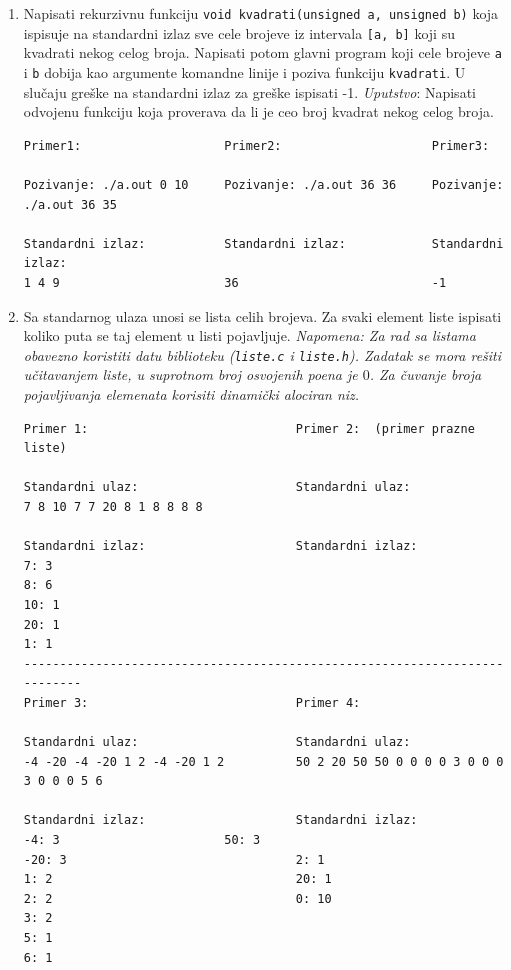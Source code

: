 \begin{enumerate}
\item Napisati rekurzivnu funkciju \texttt{void kvadrati(unsigned a, unsigned b)} koja ispisuje na standardni izlaz sve cele brojeve iz intervala \texttt{[a, b]} koji su kvadrati nekog celog broja. Napisati potom glavni program koji cele brojeve \texttt{a} i \texttt{b} dobija kao argumente komandne linije i poziva funkciju \texttt{kvadrati}. U slučaju greške na standardni izlaz za greške ispisati -1. \emph{Uputstvo}: Napisati odvojenu funkciju koja proverava da li je ceo broj kvadrat nekog celog broja.
\begin{verbatim}
Primer1:                    Primer2:                     Primer3:                    
 
Pozivanje: ./a.out 0 10     Pozivanje: ./a.out 36 36     Pozivanje: ./a.out 36 35    

Standardni izlaz:           Standardni izlaz:            Standardni izlaz:           
1 4 9                       36                           -1                          
\end{verbatim}

\item Sa standarnog ulaza unosi se lista celih brojeva. Za svaki element liste ispisati koliko puta se taj element u listi pojavljuje. {\em Napomena: Za rad sa listama obavezno koristiti datu biblioteku ({\tt liste.c} i {\tt liste.h}). Zadatak se mora rešiti učitavanjem liste, u suprotnom broj osvojenih poena je $0$. Za čuvanje broja pojavljivanja elemenata korisiti dinamički alociran niz.}
\begin{verbatim}
Primer 1:                             Primer 2:  (primer prazne liste)           

Standardni ulaz:                      Standardni ulaz:      
7 8 10 7 7 20 8 1 8 8 8 8                               

Standardni izlaz:                     Standardni izlaz:     
7: 3
8: 6
10: 1
20: 1
1: 1
---------------------------------------------------------------------------
Primer 3:                             Primer 4:   

Standardni ulaz:                      Standardni ulaz:
-4 -20 -4 -20 1 2 -4 -20 1 2          50 2 20 50 50 0 0 0 0 3 0 0 0 3 0 0 0 5 6

Standardni izlaz:                     Standardni izlaz:
-4: 3                       50: 3
-20: 3                                2: 1
1: 2                                  20: 1
2: 2                                  0: 10
3: 2
5: 1
6: 1
\end{verbatim}


\end{enumerate}
